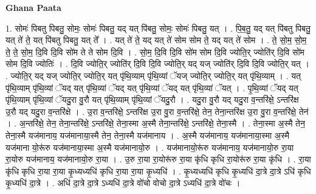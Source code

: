 \documentclass[17pt]{extarticle}
\begin{document}
\textbf{Ghana Paata } \newline

1. सोमः॑ पिबतु पिबतु॒ सोमः॒ सोमः॑ पिबतु॒ यद् यत् पि॑बतु॒ सोमः॒ सोमः॑ पिबतु॒ यत् । . पि॒ब॒तु॒ यद् यत् पि॑बतु पिबतु॒ यत् ते॑ ते॒ यत् पि॑बतु पिबतु॒ यत् ते᳚ । . यत् ते॑ ते॒ यद् यत् ते॑ सोम सोम ते॒ यद् यत् ते॑ सोम । . ते॒ सो॒म॒ सो॒म॒ ते॒ ते॒ सो॒म॒ दि॒वि दि॒वि सो॑म ते ते सोम दि॒वि । . सो॒म॒ दि॒वि दि॒वि सो॑म सोम दि॒वि ज्योति॒र् ज्योति॑र् दि॒वि सो॑म सोम दि॒वि ज्योतिः॑ । . दि॒वि ज्योति॒र् ज्योति॑र् दि॒वि दि॒वि ज्योति॒र् यद् यज् ज्योति॑र् दि॒वि दि॒वि ज्योति॒र् यत् । . ज्योति॒र् यद् यज् ज्योति॒र् ज्योति॒र् यत् पृ॑थि॒व्याम् पृ॑थि॒व्यां ॅयज् ज्योति॒र् ज्योति॒र् यत् पृ॑थि॒व्याम् । . यत् पृ॑थि॒व्याम् पृ॑थि॒व्यां ॅयद् यत् पृ॑थि॒व्यां ॅयद् यत् पृ॑थि॒व्यां ॅयद् यत् पृ॑थि॒व्यां ॅयत् । . पृ॒थि॒व्यां ॅयद् यत् पृ॑थि॒व्याम् पृ॑थि॒व्यां ॅयदु॒रा वु॒रौ यत् पृ॑थि॒व्याम् पृ॑थि॒व्यां ॅयदु॒रौ । . यदु॒रा वु॒रौ यद् यदु॒रा व॒न्तरि॑क्षे॒ ऽन्तरि॑क्ष उ॒रौ यद् यदु॒रा व॒न्तरि॑क्षे । . उ॒रा व॒न्तरि॑क्षे॒ ऽन्तरि॑क्ष उ॒रा वु॒रा व॒न्तरि॑क्षे॒ तेन॒ तेना॒न्तरि॑क्ष उ॒रा वु॒रा व॒न्तरि॑क्षे॒ तेन॑ । . अ॒न्तरि॑क्षे॒ तेन॒ तेना॒न्तरि॑क्षे॒ ऽन्तरि॑क्षे॒ तेना॒स्मा अ॒स्मै तेना॒न्तरि॑क्षे॒ ऽन्तरि॑क्षे॒ तेना॒स्मै । . तेना॒स्मा अ॒स्मै तेन॒ तेना॒स्मै यज॑मानाय॒ यज॑मानाया॒स्मै तेन॒ तेना॒स्मै यज॑मानाय । . अ॒स्मै यज॑मानाय॒ यज॑मानाया॒स्मा अ॒स्मै यज॑माना यो॒रू॑रु यज॑मानाया॒स्मा अ॒स्मै यज॑मानायो॒रु । . यज॑मानायो॒रू॑रु यज॑मानाय॒ यज॑मानायो॒रु रा॒या रा॒योरु यज॑मानाय॒ यज॑मानायो॒रु रा॒या । . उ॒रु रा॒या रा॒योरू॑रु रा॒या कृ॑धि कृधि रा॒योरू॑रु रा॒या कृ॑धि । . रा॒या कृ॑धि कृधि रा॒या रा॒या कृ॒ध्यध्यधि॑ कृधि रा॒या रा॒या कृ॒ध्यधि॑ । . कृ॒ध्यध्यधि॑ कृधि कृ॒ध्यधि॑ दा॒त्रे दा॒त्रे ऽधि॑ कृधि कृ॒ध्यधि॑ दा॒त्रे । . अधि॑ दा॒त्रे दा॒त्रे ऽध्यधि॑ दा॒त्रे वो॑चो वोचो दा॒त्रे ऽध्यधि॑ दा॒त्रे वो॑चः । \newline
\end{document}
